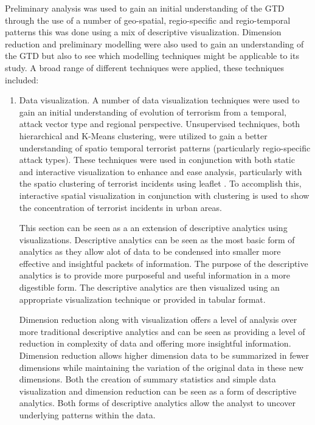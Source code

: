 Preliminary analysis was used to gain an initial understanding of the GTD through the use of a number of geo-spatial, regio-specific and regio-temporal patterns this was done using a mix of descriptive visualization. Dimension reduction and preliminary modelling were also used to gain an understanding of the GTD but also to see which modelling techniques might be applicable to its study. A broad range of different techniques were applied, these techniques included:
\begin{enumerate}
\item Data visualization. A number of data visualization techniques were used to gain an initial understanding of evolution of terrorism from a temporal, attack vector type and regional perspective. Unsupervised techniques, both hierarchical and K-Means clustering, were utilized to gain a better understanding of spatio temporal terrorist patterns (particularly regio-specific attack types). These techniques were used in conjunction with both static and interactive visualization to enhance and ease analysis, particularly with the spatio clustering of terrorist incidents using leaflet \citep{leaflet2016}. To accomplish this, interactive spatial visualization in conjunction with clustering is used to show the concentration of terrorist incidents in urban areas. 

This section can be seen as a an extension of descriptive analytics using visualizations. Descriptive analytics can be seen as the most basic form of analytics as they allow alot of data to be condensed into smaller more effective and insightful packets of information. The purpose of the descriptive analytics is to provide more purposeful and useful information in a more digestible form. The descriptive analytics are then visualized using an appropriate visualization technique or provided in tabular format. 

Dimension reduction along with visualization offers a level of analysis over more traditional descriptive analytics and can be seen as providing a level of reduction in complexity of data and offering more insightful information. Dimension reduction allows higher dimension data to be summarized in fewer dimensions while maintaining the variation of the original data in these new dimensions.  Both the creation of summary statistics and simple data visualization and dimension reduction can be seen as a form of descriptive analytics. Both forms of descriptive analytics allow the analyst to uncover underlying patterns within the data.


\end{enumerate}
